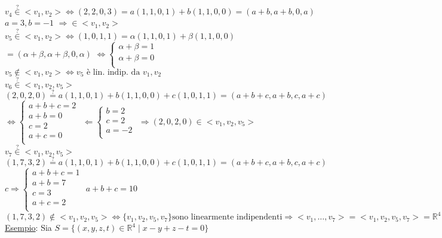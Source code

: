 \(
v_4 \overset{?}{\in} <v_1, v_2> \Leftrightarrow (2,2,0,3) = a(1,1,0,1) + b(1,1,0,0) = (a + b, a + b, 0, a)
\)
\centering
\(
a = 3 , b = -1
\)
$\Rightarrow \in <v_1, v_2>$\\
\(
v_5 \overset{?}{\in} <v_1, v_2> \Leftrightarrow (1,0,1,1) = \alpha(1,1,0,1) + \beta(1,1,0,0) 
\)
\(
= (\alpha + \beta, \alpha + \beta, 0, \alpha)
\)
\(
\Leftrightarrow
\begin{cases*}
	\alpha + \beta = 1 \\
	\alpha + \beta = 0 \\
\end{cases*}
\)\\
\(
v_5 \notin <v_1, v_2> \Leftrightarrow v_5 \text{ è lin. indip. da } v_1, v_2
\)\\
\(
v_6 \overset{?}{\in} <v_1, v_2, v_5>
\)
\(
(2,0,2,0) \overset{?}{=} a(1,1,0,1) + b(1,1,0,0) + c(1,0,1,1) = (a + b + c, a + b, c, a + c) 
\)
\(
\Leftrightarrow
\begin{cases}
	a + b + c = 2 \\
	a + b = 0 \\
	c = 2 \\
	a + c = 0 \\
\end{cases}
\)
\(
\Leftarrow
\begin{cases*}
	b = 2 \\
	c = 2 \\
	a = -2 \\
\end{cases*}
\)
\(
\Rightarrow
(2,0,2,0) \in <v_1, v_2, v_5>
\)\\
\(
v_7 \overset{?}{\in} <v_1, v_2, v_5>
\)
\(
(1,7,3,2) \overset{?}{=} a(1,1,0,1) + b(1,1,0,0) + c(1,0,1,1) = (a + b + c, a + b, c, a + c)
\)
\(
c \Rightarrow
\begin{cases*}
	a + b + c = 1 \\
	a + b = 7 \\
	c = 3 \\
	a + c = 2 \\
\end{cases*}
\)
\(
a + b + c = 10
\)\\
\(
(1,7,3,2) \notin <v_1, v_2, v_5> \Leftrightarrow \{ v_1, v_2, v_5, v_7\} \text{sono linearmente indipendenti} \Rightarrow <v_1, \dots, v_7> = <v_1, v_2, v_5, v_7> = \mathbb{R}^4
\)\\

\flushleft\textsf{\small \underline{Esempio}: Sia $S = \{ (x,y,z,t) \in \mathbb{R}^4 \mid x - y + z - t = 0\}$}\\

